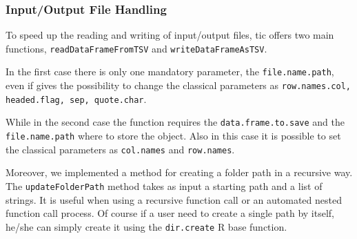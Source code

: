 \subsubsection{Input/Output File Handling}

To speed up the reading and writing of input/output files, \gls{tic} offers two main functions, \lstinline!readDataFrameFromTSV! and \lstinline!writeDataFrameAsTSV!.

In the first case there is only one mandatory parameter, the \lstinline!file.name.path!, even if gives the possibility to change the classical parameters as \lstinline!row.names.col, headed.flag, sep, quote.char!.

While in the second case the function requires the \lstinline!data.frame.to.save! and the \lstinline!file.name.path! where to store the object. 
Also in this case it is possible to set the classical parameters as \lstinline!col.names! and \lstinline!row.names!.

Moreover, we implemented a method for creating a folder path in a recursive way.
The \lstinline!updateFolderPath! method takes as input a starting path and a list of strings. 
It is useful when using a recursive function call or an automated nested function call process.
Of course if a user need to create a single path by itself, he/she can simply create it using the \lstinline!dir.create! R base function.


















